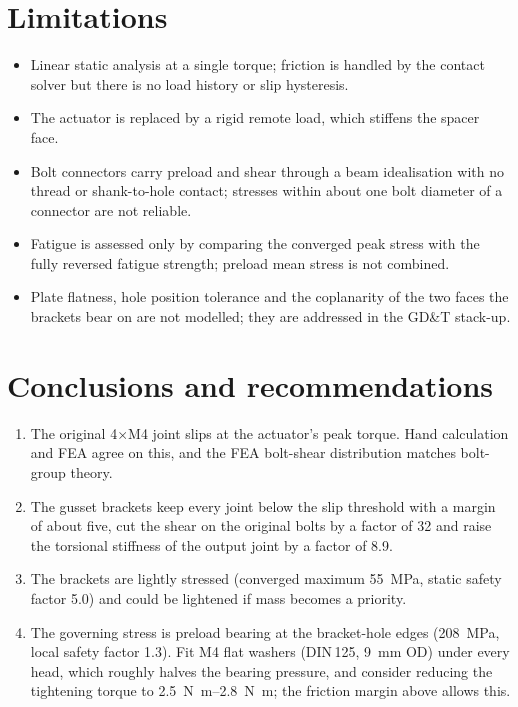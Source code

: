 \documentclass[11pt,letterpaper]{article}
\begin{document}
\section{Limitations}
\begin{itemize}
  \item Linear static analysis at a single torque; friction is handled by the contact
        solver but there is no load history or slip hysteresis.
  \item The actuator is replaced by a rigid remote load, which stiffens the spacer face.
  \item Bolt connectors carry preload and shear through a beam idealisation with no
        thread or shank-to-hole contact; stresses within about one bolt diameter of a
        connector are not reliable.
  \item Fatigue is assessed only by comparing the converged peak stress with the
        fully reversed fatigue strength; preload mean stress is not combined.
  \item Plate flatness, hole position tolerance and the coplanarity of the two faces the
        brackets bear on are not modelled; they are addressed in the GD\&T stack-up.
\end{itemize}

\section{Conclusions and recommendations}
\begin{enumerate}
  \item The original 4$\times$M4 joint slips at the actuator's peak torque. Hand
        calculation and FEA agree on this, and the FEA bolt-shear distribution matches
        bolt-group theory.
  \item The gusset brackets keep every joint below the slip threshold with a margin of
        about five, cut the shear on the original bolts by a factor of 32 and raise the
        torsional stiffness of the output joint by a factor of 8.9.
  \item The brackets are lightly stressed (converged maximum \SI{55}{MPa}, static safety
        factor 5.0) and could be lightened if mass becomes a priority.
  \item The governing stress is preload bearing at the bracket-hole edges
        (\SI{208}{MPa}, local safety factor 1.3). Fit M4 flat washers (DIN\,125,
        \SI{9}{mm} OD) under every head, which roughly halves the bearing pressure, and
        consider reducing the tightening torque to \SIrange{2.5}{2.8}{\newton\metre};
        the friction margin above allows this.
\end{enumerate}
\end{document}
